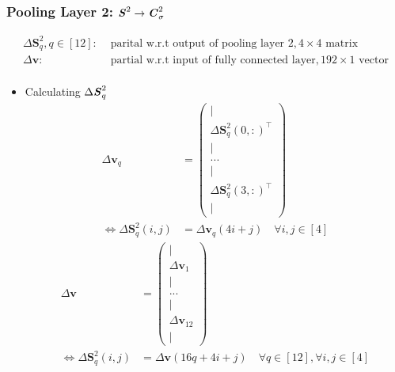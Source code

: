 \documentclass[12pt]{article}
\renewcommand{\vec}[1]{\mathbf{#1}}
\begin{document}
\subsubsection{Pooling Layer 2: $ \textbf{\textit{S}}^2 \rightarrow \textbf{\textit{C}}^2_\sigma$}
\begin{align*}
    \Delta \bm{S}^2_q, q \in [12]:& \text{ parital w.r.t output of pooling layer 2}, 4 \times 4 \text{ matrix}\\
    \Delta\vec{v}:& \text{ partial w.r.t input of fully connected layer}, 192 \times 1 \text{ vector}\\
\end{align*}
\begin{itemize}
\item Calculating $\Delta \textbf{\textit{S}}_q^2$
\begin{align*}
    \Delta \vec{v}_q &= \begin{pmatrix} | \\ \Delta \bm{S}^2_q(0, :)^\top \\ | \\ ... \\ | \\ \Delta \bm{S}^2_q(3, :)^\top \\ | \end{pmatrix}\\
    \Leftrightarrow \Delta \bm{S}^2_q(i, j) &= \Delta \vec{v}_q(4i + j) \quad \forall i, j \in [4]
\end{align*}
\begin{align*}
    \Delta \vec{v} &= \begin{pmatrix} | \\ \Delta \vec{v}_1 \\ | \\ ... \\ | \\ \Delta \vec{v}_{12} \\ | \end{pmatrix}\\
    \Leftrightarrow \Delta \bm{S}^2_q(i, j) &= \Delta \vec{v}(16q + 4i + j) \quad \forall q \in [12], \forall i, j \in [4]
\end{align*}
\end{itemize}
\end{document}
